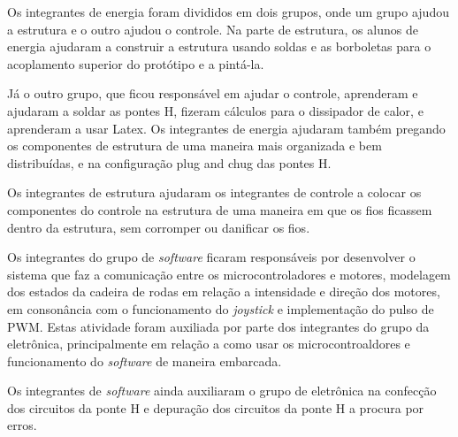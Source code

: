 Os integrantes de energia foram divididos em dois grupos, onde um grupo ajudou a
estrutura e o outro ajudou o controle. Na parte de estrutura, os alunos de energia ajudaram a construir a estrutura usando soldas e as borboletas para o acoplamento superior do protótipo e a pintá-la.

Já o outro grupo, que ficou responsável em ajudar o controle, aprenderam e ajudaram a soldar as pontes H, fizeram cálculos para o dissipador de calor, e aprenderam a usar Latex. Os integrantes de energia ajudaram também pregando os componentes de estrutura de uma maneira mais organizada e bem distribuídas, e na configuração plug and chug das pontes H.

Os integrantes de estrutura ajudaram os integrantes de controle a colocar os componentes do controle na estrutura de uma maneira em que os fios ficassem dentro da estrutura, sem corromper ou danificar os fios.

Os integrantes do grupo de \textit{software} ficaram responsáveis por desenvolver o sistema que faz a comunicação entre os microcontroladores e motores, modelagem dos estados da cadeira de rodas em relação a intensidade e direção dos motores, em consonância com o funcionamento do \textit{joystick} e implementação do pulso de PWM. Estas atividade foram auxiliada por parte dos integrantes do grupo da eletrônica, principalmente em relação a como usar os microcontroaldores e funcionamento do \textit{software} de maneira embarcada.

Os integrantes de \textit{software} ainda auxiliaram o grupo de eletrônica na confecção dos circuitos da ponte H e depuração dos circuitos da ponte H a procura por erros.

